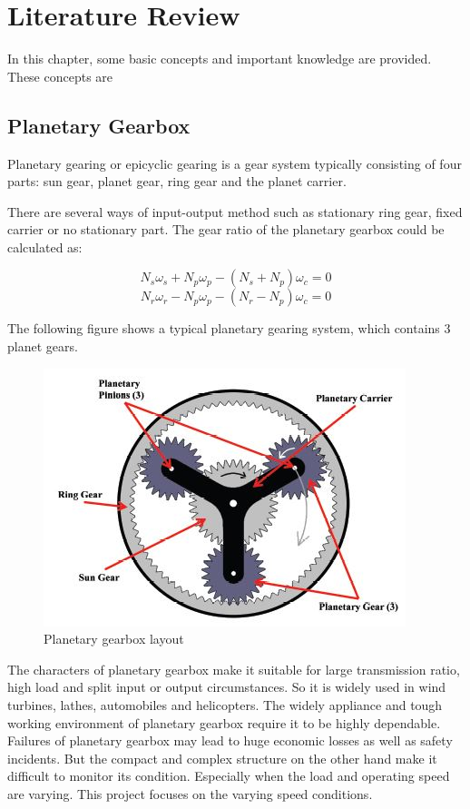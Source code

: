 \chapter{Literature Review}\label{ch:literature}

In this chapter, some basic concepts and important knowledge are provided. These concepts are 

\section{Planetary Gearbox}

Planetary gearing or epicyclic gearing is a gear system typically consisting of four parts: sun gear, planet gear, ring gear and the planet carrier.

There are several ways of input-output method such as stationary ring gear, fixed carrier or no stationary part. The gear ratio of the planetary gearbox could be calculated as:

\begin{equation}
	N_s\omega_s + N_p\omega_p - (N_s + N_p)\omega_c = 0
\end{equation}
\begin{equation}
	N_r\omega_r - N_p\omega_p - (N_r - N_p)\omega_c = 0
\end{equation}

The following figure shows a typical planetary gearing system, which contains 3 planet gears.

\begin{figure}
	\centering
	\includegraphics{PGB}
	\caption{Planetary gearbox layout \cite{gearbox}}
	\label{simulationfigure}
\end{figure}

The characters of planetary gearbox make it suitable for large transmission ratio, high load and split input or output circumstances. So it is widely used in wind turbines, lathes, automobiles and helicopters. The widely appliance and tough working environment of planetary gearbox require it to be highly dependable. Failures of planetary gearbox may lead to huge economic losses as well as safety incidents. But the compact and complex structure on the other hand make it difficult to monitor its condition. Especially when the load and operating speed are varying. This project focuses on the varying speed conditions.


